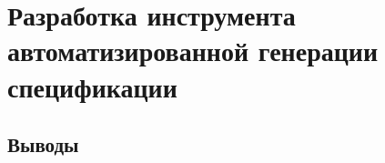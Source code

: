 \chapter{Разработка инструмента автоматизированной генерации спецификации}

\blindtext

\section{Выводы}
